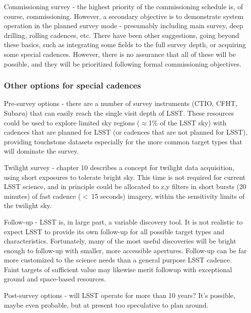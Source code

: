 \begin{description}
\item{Commissioning survey} - the highest priority of the commissioning
schedule is, of course, commissioning.  However, a secondary objective
is to demonstrate system operation in the planned survey mode -
presumably including main survey, deep drilling, rolling cadences, etc.
There have been other suggestions, going beyond these basics, such as
integrating some fields to the full survey depth, or acquiring some
special cadences.  However, there is no assurance that all of these will
be possible, and they will be prioritized following formal commissioning
objectives.

\end{description}

\subsubsection{Other options for special cadences}

Pre-survey options - there are a number of survey instruments (CTIO,
CFHT, Subaru) that can easily reach the single visit depth of LSST.
These resources could be used to explore limited sky regions
($\approx$1\% of the LSST sky) with cadences that are planned for LSST
(or cadences that are not planned for LSST), providing touchstone
datasets especially for the more common target types that will dominate
the survey.

Twilight survey - chapter 10 describes a concept for twilight data
acquisition, using short exposures to tolerate bright sky.  This time is
not required for current LSST science, and in principle could be
allocated to z,y filters in short bursts (20 minutes) of fast cadence
($<~$15 seconds) imagery, within the sensitivity limits of the twilight
sky.

Follow-up - LSST is, in large part, a variable discovery tool.  It is
not realistic to expect LSST to provide its own follow-up for all
possible target types and characteristics. Fortunately, many of the most
useful discoveries will be bright enough to follow-up with smaller, more
accessible apertures.  Follow-up can be far more customized to the
science needs than a general purpose LSST cadence.  Faint targets of
sufficient value may likewise merit followup with exceptional  ground
and space-based resources.

Post-survey options - will LSST operate for more than 10 years? It's
possible, maybe even probable, but at present too speculative to plan
around.


